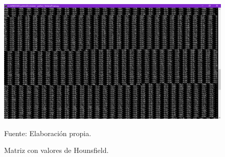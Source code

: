 \documentclass[12pt]{report}
\begin{document}
\begin{figure}[H]
\centering
\includegraphics[width = 12 cm, height = 18 cm]{matriz}
\caption{Matriz con valores de Hounsfield.}
Fuente: Elaboración propia.
\end{figure}
\end{document}
